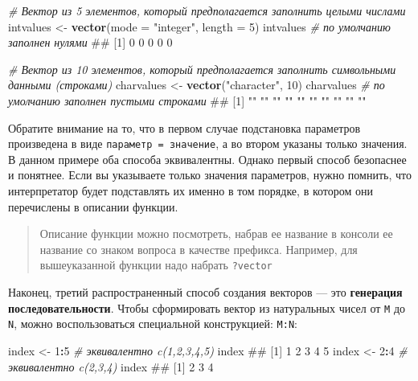 \documentclass[]{book}
\newenvironment{Shaded}{\begin{snugshade}}{\end{snugshade}}
\newcommand{\KeywordTok}[1]{\textcolor[rgb]{0.13,0.29,0.53}{\textbf{#1}}}
\newcommand{\DataTypeTok}[1]{\textcolor[rgb]{0.13,0.29,0.53}{#1}}
\newcommand{\DecValTok}[1]{\textcolor[rgb]{0.00,0.00,0.81}{#1}}
\newcommand{\StringTok}[1]{\textcolor[rgb]{0.31,0.60,0.02}{#1}}
\newcommand{\CommentTok}[1]{\textcolor[rgb]{0.56,0.35,0.01}{\textit{#1}}}
\newcommand{\OperatorTok}[1]{\textcolor[rgb]{0.81,0.36,0.00}{\textbf{#1}}}
\newcommand{\NormalTok}[1]{#1}
\begin{document}
\begin{Shaded}
\begin{Highlighting}[]
\CommentTok{# Вектор из 5 элементов, который предполагается заполнить целыми числами}
\NormalTok{intvalues <-}\StringTok{ }\KeywordTok{vector}\NormalTok{(}\DataTypeTok{mode =} \StringTok{"integer"}\NormalTok{, }\DataTypeTok{length =} \DecValTok{5}\NormalTok{)}
\NormalTok{intvalues }\CommentTok{# по умолчанию заполнен нулями}
\NormalTok{## [1] 0 0 0 0 0}

\CommentTok{# Вектор из 10 элементов, который предполагается заполнить символьными данными (строками)}
\NormalTok{charvalues <-}\StringTok{ }\KeywordTok{vector}\NormalTok{(}\StringTok{"character"}\NormalTok{, }\DecValTok{10}\NormalTok{)}
\NormalTok{charvalues }\CommentTok{# по умолчанию заполнен пустыми строками}
\NormalTok{##  [1] "" "" "" "" "" "" "" "" "" ""}
\end{Highlighting}
\end{Shaded}

Обратите внимание на то, что в первом случае подстановка параметров
произведена в виде \texttt{параметр\ =\ значение}, а во втором указаны
только значения. В данном примере оба способа эквивалентны. Однако
первый способ безопаснее и понятнее. Если вы указываете только значения
параметров, нужно помнить, что интерпретатор будет подставлять их именно
в том порядке, в котором они перечислены в описании функции.

\begin{quote}
Описание функции можно посмотреть, набрав ее название в консоли ее
название со знаком вопроса в качестве префикса. Например, для
вышеуказанной функции надо набрать \texttt{?vector}
\end{quote}

Наконец, третий распространенный способ создания векторов --- это
\textbf{генерация последовательности}. Чтобы сформировать вектор из
натуральных чисел от \texttt{M} до \texttt{N}, можно воспользоваться
специальной конструкцией: \texttt{M:N}:

\begin{Shaded}
\begin{Highlighting}[]
\NormalTok{index <-}\StringTok{ }\DecValTok{1}\OperatorTok{:}\DecValTok{5} \CommentTok{# эквивалентно c(1,2,3,4,5)}
\NormalTok{index}
\NormalTok{## [1] 1 2 3 4 5}
\NormalTok{index <-}\StringTok{ }\DecValTok{2}\OperatorTok{:}\DecValTok{4} \CommentTok{# эквивалентно c(2,3,4)}
\NormalTok{index}
\NormalTok{## [1] 2 3 4}
\end{Highlighting}
\end{Shaded}
\end{document}

